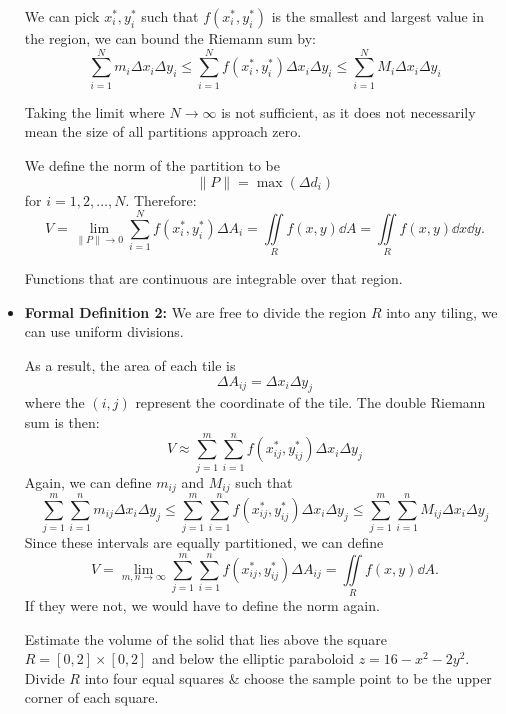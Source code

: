 \begin{itemize}
\begin{equation}
    \end{equation}
    We can pick $x_i^*,y_i^*$ such that $f(x_i^*,y_i^*)$ is the smallest and largest value in the region, we can bound the Riemann sum by: 
    \begin{equation}
        \sum_{i=1}^N m_i \Delta x_i \Delta y_i \le \sum_{i=1}^N f(x_i^*,y_i^*)\Delta x_i\Delta y_i \le \sum_{i=1}^N M_i \Delta x_i \Delta y_i
    \end{equation}
    \begin{warning}
        Taking the limit where $N\rightarrow \infty$ is not sufficient, as it does not necessarily mean the size of all partitions approach zero.
    \end{warning}
    We define the norm of the partition to be
    \begin{equation}
        \lVert P \rVert = \max(\Delta d_i)
    \end{equation}
    for $i=1,2,\dots,N$. Therefore: 
    \begin{equation}
        V = \lim_{\lVert P \rVert \rightarrow 0} \sum_{i=1}^N f(x_i^*,y_i^*)\Delta A_i = \iint\limits_{R}f(x,y)\dd{A} = \iint\limits_{R}f(x,y)\dd{x}\dd{y}.
    \end{equation}
    \begin{idea}
        Functions that are continuous are integrable over that region.
    \end{idea}
    \item \textbf{Formal Definition 2:} We are free to divide the region $R$ into any tiling, we can use uniform divisions.
    
    As a result, the area of each tile is 
    \begin{equation}
        \Delta A_{ij}=\Delta x_i\Delta y_j
    \end{equation}
    where the $(i,j)$ represent the coordinate of the tile. The double Riemann sum is then:
    \begin{equation}
        V \approx \sum_{j=1}^m \sum_{i=1}^n f(x_{ij}^*,y_{ij}^*)\Delta x_i \Delta y_j
    \end{equation}
    Again, we can define $m_{ij}$ and $M_{ij}$ such that 
    \begin{equation}
        \sum_{j=1}^m \sum_{i=1}^n m_{ij}\Delta x_i \Delta y_j \le \sum_{j=1}^m \sum_{i=1}^n f(x_{ij}^*,y_{ij}^*)\Delta x_i \Delta y_j \le \sum_{j=1}^m \sum_{i=1}^n M_{ij}\Delta x_i \Delta y_j
    \end{equation}
    Since these intervals are equally partitioned, we can define
    \begin{equation}
        V = \lim_{m,n\rightarrow \infty} \sum_{j=1}^m \sum_{i=1}^n f(x_{ij}^*, y_{ij}^*)\Delta A_{ij} = \iint\limits_{R} f(x,y)\dd{A}.
    \end{equation}
    If they were not, we would have to define the norm again.
    \begin{example}
        Estimate the volume of the solid that lies above the square $R=[0,2]\times [0,2]$ and below the elliptic paraboloid $z=16-x^2-2y^2$. Divide $R$ into four equal squares \& choose the sample point to be the upper corner of each square.
        \vspace{2mm}


\end{example}
\end{itemize}
